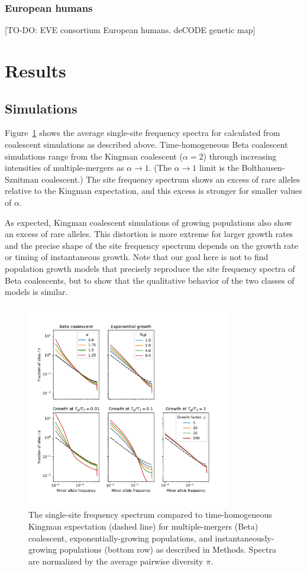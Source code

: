 \documentclass[11pt, letterpaper]{article}   	%
\newcommand{\Fig}[1]{Figure~\ref{#1}}
\begin{document}
\subsubsection{European humans}
[TO-DO: EVE consortium European humans. deCODE genetic map]

\section{Results}

\subsection{Simulations}
\Fig{fig:msfs} shows the average single-site frequency spectra for calculated from coalescent simulations as described above.
Time-homogeneous Beta coalescent simulations range from the Kingman coalescent ($\alpha=2$) through increasing intensities of multiple-mergers as $\alpha \to 1$.
(The $\alpha  \to 1$ limit is the Bolthausen-Sznitman coalescent.)
The site frequency spectrum shows an excess of rare alleles relative to the Kingman expectation, and this excess is stronger for smaller values of $\alpha$.

As expected, Kingman coalescent simulations of growing populations also show an excess of rare alleles.
This distortion is more extreme for larger growth rates and the precise shape of the site frequency spectrum depends on the growth rate or timing of instantaneous growth.
Note that our goal here is not to find population growth models that precisely reproduce the site frequency spectra of Beta coalescents, but to show that the qualitative behavior of the two classes of models is similar.

\begin{figure}
\centering
\includegraphics[width=0.8\textwidth]{figures/mSFS.pdf}
\caption{The single-site frequency spectrum compared to time-homogeneous Kingman expectation (dashed line) for multiple-mergers (Beta) coalescent, exponentially-growing populations, and instantaneously-growing populations (bottom row) as described in Methods. Spectra are normalized by the average pairwise diversity $\pi$.  \label{fig:msfs}}
\end{figure}
\end{document}
